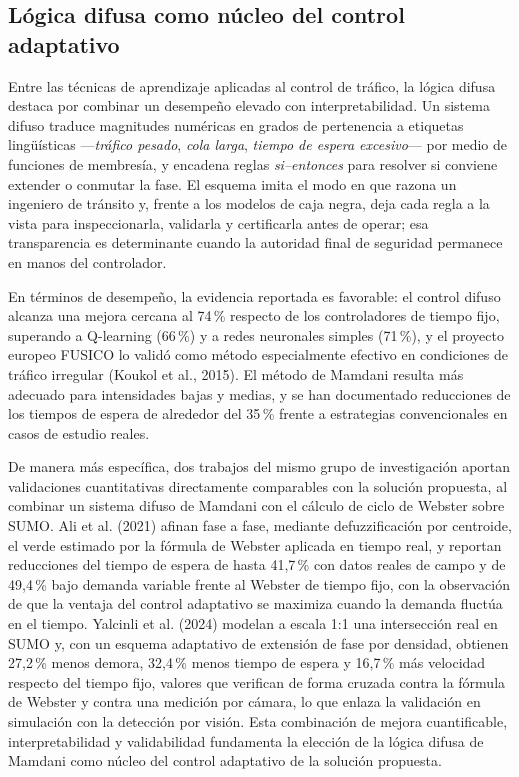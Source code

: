 \subsection{Lógica difusa como núcleo del control adaptativo}

Entre las técnicas de aprendizaje aplicadas al control de tráfico, la lógica difusa destaca por combinar un
desempeño elevado con interpretabilidad. Un sistema difuso traduce magnitudes numéricas en grados de
pertenencia a etiquetas lingüísticas —\emph{tráfico pesado}, \emph{cola larga}, \emph{tiempo de espera
excesivo}— por medio de funciones de membresía, y encadena reglas \emph{si--entonces} para resolver si
conviene extender o conmutar la fase. El esquema imita el modo en que razona un ingeniero de tránsito y,
frente a los modelos de caja negra, deja cada regla a la vista para inspeccionarla, validarla y certificarla
antes de operar; esa transparencia es determinante cuando la autoridad final de seguridad permanece en manos
del controlador.

En términos de desempeño, la evidencia reportada es favorable: el control difuso alcanza una mejora cercana
al 74\,\% respecto de los controladores de tiempo fijo, superando a Q-learning (66\,\%) y a redes neuronales
simples (71\,\%), y el proyecto europeo FUSICO lo validó como método especialmente efectivo en condiciones
de tráfico irregular (Koukol et al., 2015). El método de Mamdani resulta más adecuado para intensidades
bajas y medias, y se han documentado reducciones de los tiempos de espera de alrededor del 35\,\% frente a
estrategias convencionales en casos de estudio reales.

De manera más específica, dos trabajos del mismo grupo de investigación aportan validaciones cuantitativas
directamente comparables con la solución propuesta, al combinar un sistema difuso de Mamdani con el cálculo de
ciclo de Webster sobre SUMO. Ali et al. (2021) afinan fase a fase, mediante defuzzificación por centroide, el
verde estimado por la fórmula de Webster aplicada en tiempo real, y reportan reducciones del tiempo de espera
de hasta 41,7\,\% con datos reales de campo y de 49,4\,\% bajo demanda variable frente al Webster de tiempo
fijo, con la observación de que la ventaja del control adaptativo se maximiza cuando la demanda fluctúa en el
tiempo. Yalcinli et al. (2024) modelan a escala 1:1 una intersección real en SUMO y, con un esquema adaptativo
de extensión de fase por densidad, obtienen 27,2\,\% menos demora, 32,4\,\% menos tiempo de espera y 16,7\,\%
más velocidad respecto del tiempo fijo, valores que verifican de forma cruzada contra la fórmula de Webster y
contra una medición por cámara, lo que enlaza la validación en simulación con la detección por visión. Esta
combinación de mejora cuantificable, interpretabilidad y validabilidad fundamenta la elección de la lógica
difusa de Mamdani como núcleo del control adaptativo de la solución propuesta.


